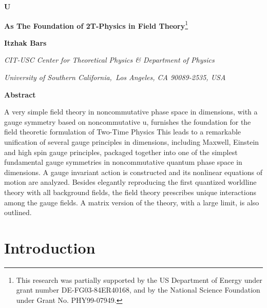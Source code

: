 \documentclass[a4paper,12pt]{article}
\begin{document}

{\vskip0.5cm}

\begin{center}
{\Large \textbf{U}}\myHighlight{$_{\star }$}

{\Large \textbf{As The Foundation of 2T-Physics in Field Theory}}{\footnote{%
This research was partially supported by the US Department of Energy under
grant number DE-FG03-84ER40168, and by the National Science Foundation under
Grant No. PHY99-07949.}}

\bigskip

{\vskip0.5cm}

\textbf{Itzhak Bars}

{\vskip0.5cm}

\textsl{CIT-USC Center for Theoretical Physics \& Department of Physics}

\textsl{University of Southern California,\ Los Angeles, CA 90089-2535, USA}

{\vskip0.5cm}

\textbf{Abstract}
\end{center}

A very simple field theory in noncommutative phase space \coordHE{} in \coordHE{} dimensions, with a gauge symmetry based on noncommutative u\coordHE{}, furnishes the foundation for the field theoretic
formulation of Two-Time Physics\coordHE{} This leads to a remarkable unification of
several gauge principles in \coordHE{} dimensions, including Maxwell, Einstein and
high spin gauge principles, packaged together into one of the simplest
fundamental gauge symmetries in noncommutative quantum phase space in \coordHE{}
dimensions. A gauge invariant action is constructed and its nonlinear
equations of motion are analyzed. Besides elegantly reproducing the first
quantized worldline theory with all background fields, the field theory
prescribes unique interactions among the gauge fields. A matrix version of
the theory, with a large \coordHE{} limit, is also outlined.

\section{Introduction}
\end{document}
